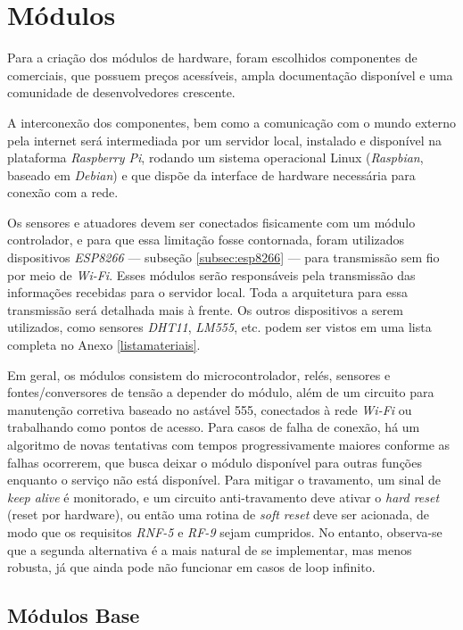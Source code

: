 \section{Módulos}
Para a criação dos módulos de hardware, foram escolhidos componentes de \wiot{} comerciais, que possuem preços acessíveis, ampla documentação disponível e uma comunidade de desenvolvedores crescente.

A interconexão dos componentes, bem como a comunicação com o mundo externo pela internet será intermediada por um servidor local, instalado e disponível na plataforma \emph{Raspberry Pi}, rodando um sistema operacional Linux (\emph{Raspbian}, baseado em \emph{Debian}) e que dispõe da interface de hardware necessária para conexão com a rede.

Os sensores e atuadores devem ser conectados fisicamente com um módulo controlador, e para que essa limitação fosse contornada, foram utilizados dispositivos \emph{ESP8266} --- subseção \ref{subsec:esp8266} --- para transmissão sem fio por meio de \emph{Wi-Fi}. Esses módulos serão responsáveis pela transmissão das informações recebidas para o servidor local. Toda a arquitetura para essa transmissão será detalhada mais à frente. Os outros dispositivos a serem utilizados, como sensores \emph{DHT11}, \emph{LM555}, etc. podem ser vistos em uma lista completa no Anexo \ref{listamateriais}.

Em geral, os módulos consistem do microcontrolador, relés, sensores e fontes\slash{}conversores de tensão a depender do módulo, além de um circuito para manutenção corretiva baseado no astável 555, conectados à rede \emph{Wi-Fi} ou trabalhando como pontos de acesso. Para casos de falha de conexão, há um algoritmo de novas tentativas com tempos progressivamente maiores conforme as falhas ocorrerem, que busca deixar o módulo disponível para outras funções enquanto o serviço não está disponível. Para mitigar o travamento, um sinal de \textit{keep alive} é monitorado, e um circuito anti-travamento deve ativar o \textit{hard reset} (reset por hardware), ou então uma rotina de \textit{soft reset} deve ser acionada, de modo que os requisitos \emph{RNF-5} e \emph{RF-9} sejam cumpridos. No entanto, observa-se que a segunda alternativa é a mais natural de se implementar, mas menos robusta, já que ainda pode não funcionar em casos de loop infinito.

\subsection{Módulos Base}
